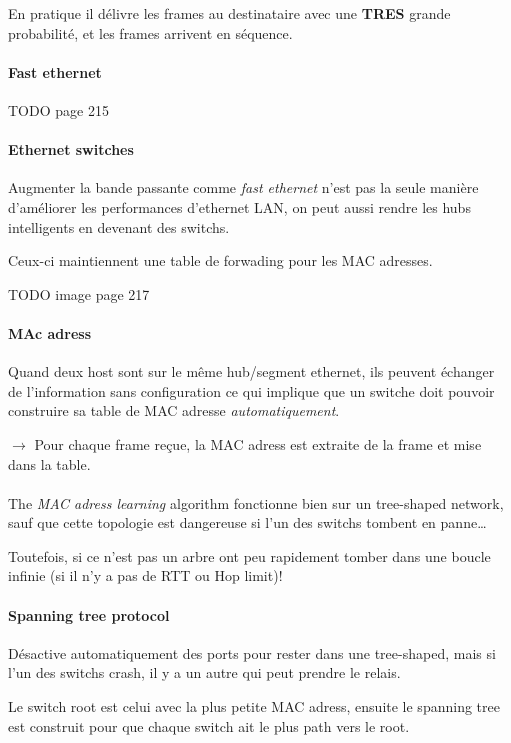 En pratique il délivre les frames au destinataire avec une \textbf{TRES} grande probabilité,
et les frames arrivent en séquence.

\paragraph{Fast ethernet}
TODO page 215

\paragraph{Ethernet switches}
Augmenter la bande passante comme \textit{fast ethernet} n'est pas la seule
manière d'améliorer les performances d'ethernet LAN, on peut aussi rendre
les hubs intelligents en devenant des switchs.

Ceux-ci maintiennent une table de forwading pour les MAC adresses.

TODO image page 217


\paragraph{MAc adress}
Quand deux host sont sur le même hub/segment ethernet, ils peuvent échanger de
l'information sans configuration ce qui implique que un switche doit pouvoir
construire sa table de MAC adresse \textit{automatiquement}.

$\rightarrow$ Pour chaque frame reçue, la MAC adress est extraite de la frame et mise dans la table.

\paragraph{ }
The \textit{MAC adress learning} algorithm fonctionne bien sur un tree-shaped network,
sauf que cette topologie est dangereuse si l'un des switchs tombent en panne\ldots

Toutefois, si ce n'est pas un arbre ont peu rapidement tomber dans une boucle infinie
(si il n'y a pas de RTT ou Hop limit)!

\paragraph{Spanning tree protocol}
Désactive automatiquement des ports pour rester dans une tree-shaped, mais si l'un
des switchs crash, il y a un autre qui peut prendre le relais.

Le switch root est celui avec la plus petite MAC adress, ensuite le spanning tree est construit
pour que chaque switch ait le plus path vers le root.

